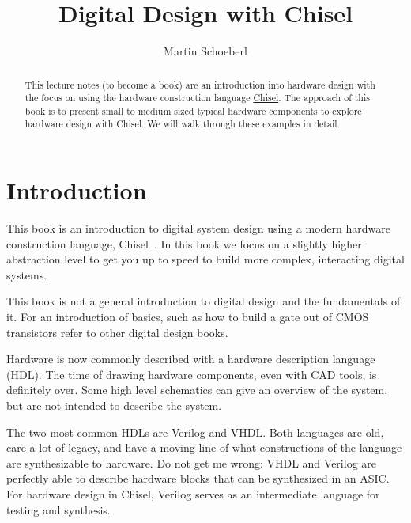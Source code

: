 \documentclass[a4paper]{article}
\begin{document}
\title{Digital Design with Chisel}

\author{Martin Schoeberl}




\maketitle \thispagestyle{empty}

\begin{abstract}
This lecture notes (to become a book) are an introduction into hardware design with the focus
on using the hardware construction language
\href{https://chisel.eecs.berkeley.edu/}{Chisel}. The approach of this book
is to present small to medium sized typical hardware components to explore
hardware design with Chisel.
We will walk through these examples in detail.
\end{abstract}


\section{Introduction}
\label{sec:intro}

This book is an introduction to digital system design using a modern hardware
construction language, Chisel~\cite{chisel:dac2012}.
In this book we focus on a slightly higher abstraction level to get you up to
speed to build more complex, interacting digital systems.

This book is not a general introduction to digital design and the fundamentals
of it.
For an introduction of basics, such as how to build a gate out of CMOS transistors
refer to other digital design books.

Hardware is now commonly described with a hardware description language (HDL).
The time of drawing hardware components, even with CAD tools, is definitely
over. Some high level schematics can give an overview of the system, but are
not intended to describe the system.

The two most common HDLs are Verilog and VHDL. Both languages are old,
care a lot of legacy, and have a moving line of what constructions of the language
are synthesizable to hardware.
Do not get me wrong: VHDL and Verilog are perfectly able to describe hardware
blocks that can be synthesized in an ASIC.
For hardware design in Chisel, Verilog serves as an intermediate language
for testing and synthesis.
\end{document}
